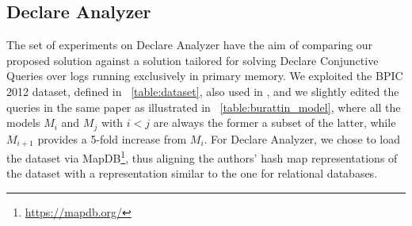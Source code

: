 \subsection{Declare Analyzer}\label{ssec:declan}
The set of experiments on Declare Analyzer have the aim of comparing our proposed solution against a solution tailored for solving Declare Conjunctive Queries over logs running exclusively in primary memory. %
We exploited the {BPIC 2012} dataset, defined in \tablename~\ref{table:dataset}, also used in \cite{BurattinMS16}, and we slightly edited the queries in the same paper as illustrated in \tablename~\ref{table:burattin_model}, where all the models $M_i$ and $M_j$ with $i<j$ are always the former a subset of the latter, while $M_{i+1}$ provides a 5-fold increase from $M_i$. For Declare Analyzer, we chose to load the dataset via MapDB\footnote{\url{https://mapdb.org/}}, thus aligning the authors' hash map representations of the dataset with a representation similar to the one for relational databases. 


